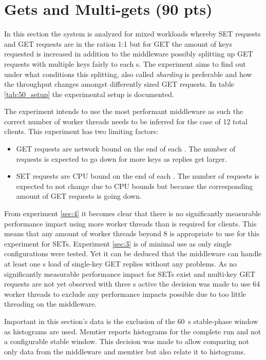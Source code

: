 \section{Gets and Multi-gets (90 pts)\label{sec:5}}

    In this section the system is analyzed for mixed workloads whereby SET requests and GET requests are in the ration
    1:1 but for GET the amount of keys requested is increased in addition to the middleware possibly splitting up GET
    requests with multiple keys fairly to each \srv{}s. The experiment aims to find out under what conditions this
    splitting, also called \emph{sharding} is preferable and how the throughput changes amongst differently sized GET
    requests. In table \ref{tab:50_setup} the experimental setup is documented.

    The experiment intends to use the most performant middleware as such the correct number of worker threads needs to
    be inferred for the case of 12 total clients. This experiment has two limiting factors:
    \begin{itemize}
        \item GET requests are network bound on the end of each \srv{}. The number of requests is expected to go down
              for more keys as replies get larger.
        \item SET requests are CPU bound on the end of each \cli{}. The number of requests is expected to not change
              due to CPU bounds but because the corresponding amount of GET requests is going down.
    \end{itemize}
    From experiment \ref{sec:4} it becomes clear that there is no significantly measurable performance impact using more
    worker threads than is required for clients. This means that any amount of worker threads beyond 8 is appropriate to
    use for this experiment for SETs. Experiment \ref{sec:3} is of minimal use as only single \srv{} configurations were
    tested. Yet it can be deduced that the middleware can handle at least one \srv{}s load of single-key GET replies
    without any problems. As no significantly measurable performance impact for SETs exist and multi-key GET requests
    are not yet observed with three \srv{}s active the decision was made to use 64 worker threads to exclude any
    performance impacts possible due to too little threading on the middleware.

    Important in this section's data is the exclusion of the \SI{60}{\second} stable-phase window as histograms are
    used. Memtier reports histograms for the complete run and not a configurable stable window. This decision was made
    to allow comparing not only data from the middleware and memtier but also relate it to histograms.


